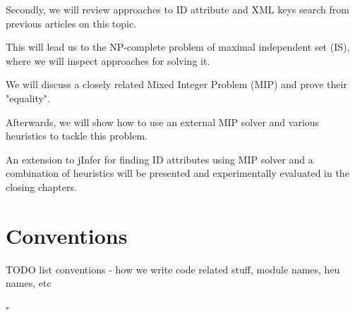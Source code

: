 \documentclass[a4paper,12pt,oneside]{report}
\theoremstyle{definition}
\let\openright=\clearpage
\def\chapwithtoc#1{
\chapter*{#1}
\addcontentsline{toc}{chapter}{#1}
}
\begin{document}
Secondly, we will review approaches to ID attribute and XML keys search from previous articles on this topic. 

This will lead us to the NP-complete problem of maximal independent set (IS), where we will inspect approaches for solving it.

We will discuss a closely related Mixed Integer Problem (MIP) and prove their "equality".

Afterwards, we will show how to use an external MIP solver and various heuristics to tackle this problem.

An extension to jInfer for finding ID attributes using MIP solver and a combination of heuristics will be presented and experimentally evaluated in the closing chapters.

\section{Conventions}

TODO list conventions - how we write code related stuff, module names, heu names, etc













\newpage
\nocite{*}



\listoffigures
{}

\listofalgorithms
{}

\listoftables
{}


\printnomenclature[2cm]


\appendix

\openright
{}







\flushright
$\square$
\end{document}
